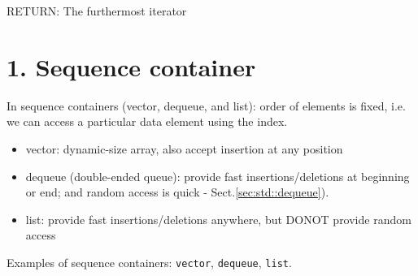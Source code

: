 RETURN: The furthermost iterator 
\section{1. Sequence container}
\label{sec:container_sequence}


In sequence containers (vector, dequeue, and list): order of elements is
fixed, i.e. we can access a particular data element using the index.

\begin{itemize}
    \item vector: dynamic-size array, also accept insertion at any position
    \item dequeue (double-ended queue): provide fast insertions/deletions at
    beginning or end; and random access is quick - Sect.\ref{sec:std::dequeue}).

    \item list: provide fast insertions/deletions anywhere, but DONOT provide
    random access
  \end{itemize}

Examples of sequence containers: \verb!vector!, \verb!dequeue!, \verb!list!.

